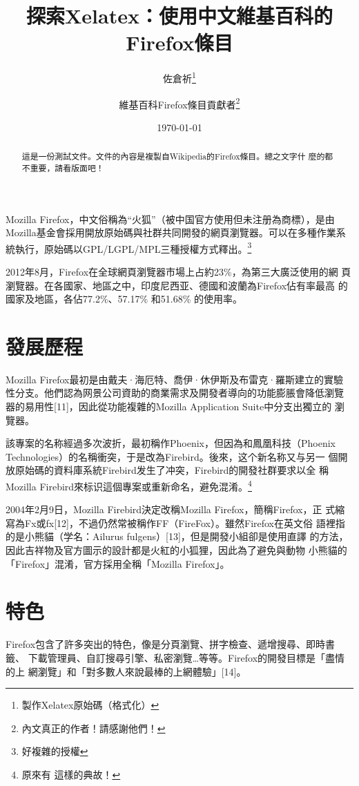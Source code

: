 \documentclass[12pt, a4paper, twoside]{article}
\begin{document}
\title{探索Xelatex：使用中文維基百科的Firefox條目}
\author{佐倉祈\thanks{製作Xelatex原始碼（格式化）}
  \and 維基百科Firefox條目貢獻者\thanks{內文真正的作者！請感謝他們！}}
\date{\today}
\maketitle

\begin{abstract}
這是一份測試文件。文件的內容是複製自Wikipedia的Firefox條目。總之文字什
麼的都不重要，請看版面吧！
\end{abstract}

Mozilla Firefox，中文俗稱為“火狐”（被中国官方使用但未注册為商標），是由
Mozilla基金會採用開放原始碼與社群共同開發的網頁瀏覽器。可以在多種作業系
統執行，原始碼以GPL/LGPL/MPL三種授權方式釋出。\footnote{好複雜的授權}

2012年8月，Firefox在全球網頁瀏覽器市場上占約23\%，為第三大廣泛使用的網
頁瀏覽器。在各國家、地區之中，印度尼西亚、德國和波蘭為Firefox佔有率最高
的國家及地區，各佔77.2\%、57.17\% 和51.68\% 的使用率。

\section{發展歷程}
Mozilla Firefox最初是由戴夫·海厄特、喬伊·休伊斯及布雷克·羅斯建立的實驗
性分支。他們認為网景公司資助的商業需求及開發者導向的功能膨脹會降低瀏覽
器的易用性[11]，因此從功能複雜的Mozilla Application Suite中分支出獨立的
瀏覽器。

該專案的名称經過多次波折，最初稱作Phoenix，但因為和鳳凰科技（Phoenix
  Technologies）的名稱衝突，于是改為Firebird。後來，这个新名称又与另一
個開放原始碼的資料庫系統Firebird发生了冲突，Firebird的開發社群要求以全
稱Mozilla Firebird來标识這個專案或重新命名，避免混淆。\footnote{原來有
  這樣的典故！}

2004年2月9日，Mozilla Firebird決定改稱Mozilla Firefox，簡稱Firefox，正
式縮寫為Fx或fx[12]，不過仍然常被稱作FF（FireFox）。雖然Firefox在英文俗
語裡指的是小熊貓（学名：Ailurus fulgens）[13]，但是開發小組卻是使用直譯
的方法，因此吉祥物及官方圖示的設計都是火紅的小狐狸，因此為了避免與動物
小熊貓的「Firefox」混淆，官方採用全稱「Mozilla Firefox」。

\section{特色}

Firefox包含了許多突出的特色，像是分頁瀏覽、拼字檢查、遞增搜尋、即時書籤、
下載管理員、自訂搜尋引擎、私密瀏覽…等等。Firefox的開發目標是「盡情的上
  網瀏覽」和「對多數人來說最棒的上網體驗」[14]。
\end{document}
